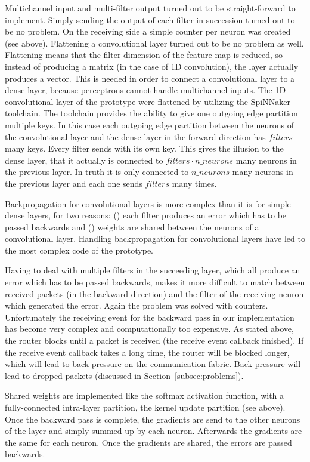 \documentclass[]{article}
\begin{document}
Multichannel input and multi-filter output turned out to be
straight-forward to implement.
Simply sending the output of each filter in succession turned out to
be no problem.
On the receiving side a simple counter per neuron was created
(see above).
Flattening a convolutional layer turned out to be no problem as well.
Flattening means that the filter-dimension of the feature map is
reduced, so instead of producing a matrix (in the case of 1D
convolution), the layer actually produces a vector.
This is needed in order to connect a convolutional layer to a dense
layer, because perceptrons cannot handle multichannel inputs.
The 1D convolutional layer of the prototype were flattened by
utilizing the SpiNNaker toolchain.
The toolchain provides the ability to give one outgoing edge partition
multiple keys.
In this case each outgoing edge partition between the neurons of the
convolutional layer and the dense layer in the forward direction has
$filters$ many keys.
Every filter sends with its own key.
This gives the illusion to the dense layer, that it actually is
connected to $filters \cdot n\_neurons$ many neurons in the previous
layer.
In truth it is only connected to $n\_neurons$ many neurons in the
previous layer and each one sends $filters$ many times.

Backpropagation for convolutional layers is more complex than it is
for simple dense layers, for two reasons: () each
filter produces an error which has to be passed backwards and
() weights are shared between the neurons of a
convolutional layer.
Handling backpropagation for convolutional layers have led to the
most complex code of the prototype.

Having to deal with multiple filters in the succeeding layer, which
all produce an error which has to be passed backwards, makes it more
difficult to match between received packets (in the backward
direction) and the filter of the receiving neuron which generated the
error.
Again the problem was solved with counters.
Unfortunately the receiving event for the backward pass in our
implementation has become very complex and computationally too
expensive.
As stated above, the router blocks until a packet is received
(the receive event callback finished).
If the receive event callback takes a long time, the router will be
blocked longer, which will lead to back-pressure on the communication
fabric.
Back-pressure will lead to dropped packets (discussed in
Section~\ref{subsec:problems}).

Shared weights are implemented like the softmax activation function,
with a fully-connected intra-layer partition, the kernel update
partition (see above).
Once the backward pass is complete, the gradients are send to the
other neurons of the layer and simply summed up by each neuron.
Afterwards the gradients are the same for each neuron.
Once the gradients are shared, the errors are passed backwards.
\end{document}
